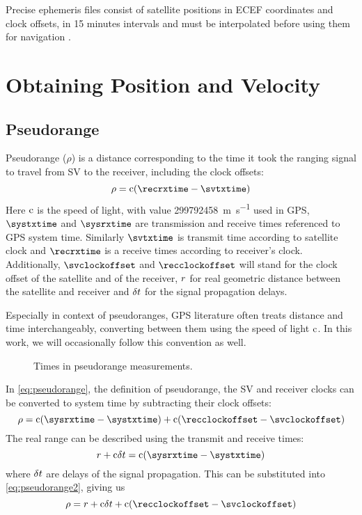 Precise ephemeris files consist of satellite positions in ECEF
coordinates and clock offsets, in 15 minutes intervals and must be interpolated
before using them for navigation \cite{schenewerk03}.

\section{Obtaining Position and Velocity}


\subsection{Pseudorange}
\label{sec:pseudorange}

Pseudorange (\(\rho\)) is a distance corresponding to the time it took the ranging
signal to travel from SV to the receiver, including the clock offsets:
\begin{equation}
	\label{eq:pseudorange}
	\rho = \speedoflight (\recrxtime - \svtxtime)
\end{equation}
Here \(\mathrm{c}\) is the speed of light, with value \SI{299792458}{\meter\per\second} used in GPS,
\(\systxtime\) and \(\sysrxtime\) are transmission and receive times referenced to GPS system time.
Similarly \(\svtxtime\) is transmit time according to satellite clock and
\(\recrxtime\) is a receive times according to receiver's clock.
Additionally, \(\svclockoffset\) and \(\recclockoffset\) will stand for the clock offset of the satellite
and of the receiver, \(r\) for real geometric distance between the satellite and receiver
and \(\delta{t}\) for the signal propagation delays.

Especially in context of pseudoranges, GPS literature often treats distance and time
interchangeably, converting between them using the speed of light \(\mathrm{c}\).
In this work, we will occasionally follow this convention as well.

\begin{figure}[tb]
	\centering
	
	\caption{Times in pseudorange measurements.}
	\label{fig:pseudorange}
\end{figure}

In \eqref{eq:pseudorange}, the definition of pseudorange, the SV and receiver clocks can be
converted to system time by subtracting their clock offsets:
\begin{equation}
	\label{eq:pseudorange2}
	\rho = \speedoflight (\sysrxtime - \systxtime) + \speedoflight (\recclockoffset - \svclockoffset)
\end{equation}
The real range can be described using the transmit and receive times:
\begin{equation}
	\geomrange + \speedoflight\geomrangedelays = \speedoflight (\sysrxtime - \systxtime)
\end{equation}
where \(\delta{t}\) are delays of the signal propagation.
This can be substituted into \eqref{eq:pseudorange2}, giving us
\begin{equation}
	\rho = \geomrange + \speedoflight\geomrangedelays + \speedoflight (\recclockoffset - \svclockoffset)
\end{equation}

